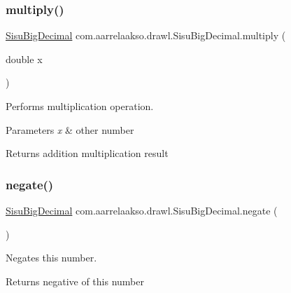\subsubsection{\texorpdfstring{multiply()}{multiply()}\hspace{0.1cm}{\footnotesize\ttfamily [3/3]}}
{\footnotesize\ttfamily \hyperlink{classcom_1_1aarrelaakso_1_1drawl_1_1_sisu_big_decimal}{Sisu\+Big\+Decimal} com.\+aarrelaakso.\+drawl.\+Sisu\+Big\+Decimal.\+multiply (\begin{DoxyParamCaption}\item[{double}]{x }\end{DoxyParamCaption})\hspace{0.3cm}{\ttfamily [protected]}}

Performs multiplication operation.


\begin{DoxyParams}{Parameters}
{\em x} & other number \\
\hline
\end{DoxyParams}
\begin{DoxyReturn}{Returns}
addition multiplication result 
\end{DoxyReturn}
\mbox{\label{classcom_1_1aarrelaakso_1_1drawl_1_1_sisu_big_decimal_a2d82668c01a8ec2b0b79c2a6cd63253c}} 
\subsubsection{\texorpdfstring{negate()}{negate()}}
{\footnotesize\ttfamily \hyperlink{classcom_1_1aarrelaakso_1_1drawl_1_1_sisu_big_decimal}{Sisu\+Big\+Decimal} com.\+aarrelaakso.\+drawl.\+Sisu\+Big\+Decimal.\+negate (\begin{DoxyParamCaption}{ }\end{DoxyParamCaption})\hspace{0.3cm}{\ttfamily [protected]}}

Negates this number.

\begin{DoxyReturn}{Returns}
negative of this number 
\end{DoxyReturn}
\mbox{\label{classcom_1_1aarrelaakso_1_1drawl_1_1_sisu_big_decimal_aa3be41b7881201bb4184ef30b8ee4ad9}} 
